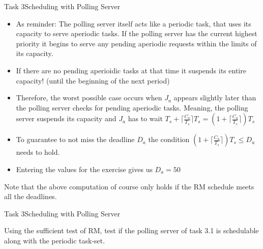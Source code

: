 \begin{frame}[allowframebreaks]{Task 3}{Scheduling with Polling Server}
    \begin{solutionnoinc}
      \begin{itemize}
          \item As reminder: The polling server itself acts like a \alert{periodic} task, that uses its capacity to serve \alert{aperiodic} tasks. If the polling server has the current highest priority it begins to serve any pending aperiodic requests within the limits of its capacity.
          \item If there are no pending aperioidic tasks at that time it \alert{suspends} its entire capacity! (until the beginning of the next period)
          \item Therefore, the worst possible case occurs when $J_a$ appears slightly later than the polling server checks for pending aperiodic tasks. Meaning, the polling server suspends its capacity and $J_a$ has to wait $T_s + \lceil \frac{C_a}{T_s}\rceil T_s = (1 + \lceil \frac{C_a}{T_s}\rceil)T_s$
      \end{itemize}
    \end{solutionnoinc}
    \framebreak
    \begin{solution}
      \begin{itemize}
          \item To guarantee to not miss the deadline $D_a$ the condition $(1 + \lceil \frac{C_a}{T_s}\rceil)T_s \leq D_a$ needs to hold.
          \item Entering the values for the exercise gives us $D_a = 50$
      \end{itemize}
    \end{solution}
    \begin{Sidenote}
      Note that the above computation of course only holds if the RM schedule meets all the deadlines.
    \end{Sidenote}
\end{frame}
\begin{frame}{Task 3}{Scheduling with Polling Server}
    \begin{tasknoinc}
    Using the sufficient test of RM, test if the polling server of task 3.1 is schedulable along with the periodic task-set.
    \end{tasknoinc}
\end{frame}
